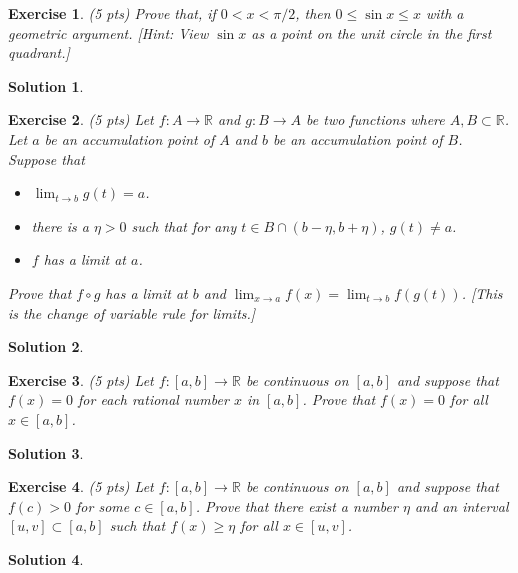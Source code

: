 \documentclass[12pt]{article}
\newcommand{\bR}{\mathbb{R}}
\newcommand{\ra}{\rightarrow}
\theoremstyle{plain}
\newtheorem{exer}{\textbf{Exercise}}}
\theoremstyle{plain}
\newtheorem*{sol}{\textbf{Solution}}}
\begin{document}
\begin{exer}
(5 pts)
Prove that, if $0 < x < \pi/2$, then $0 \leq \sin x \leq x$ with a geometric argument. [Hint: View $\sin x$ as a point on the unit circle in the first quadrant.]
\end{exer}
\begin{sol}

\end{sol}

\begin{exer}
(5 pts)
Let $f : A \ra \bR$ and $g : B \ra A$ be two functions where $A, B \subset \bR$. Let $a$ be an accumulation point of $A$ and $b$ be an accumulation point of $B$. Suppose that
	\begin{itemize}
	\item $\lim_{t \ra b} g(t) = a$.
	\item there is a $\eta > 0$ such that for any $t \in B \cap (b - \eta ,  b + \eta )$, $g(t) \neq a$.
	\item $f$ has a limit at $a$.
	\end{itemize}
Prove that $f \circ g$ has a limit at $b$ and $\lim_{x \ra a} f(x) = \lim_{t \ra b} f(g(t))$. [This is the change of variable rule for limits.]
\end{exer}
\begin{sol}

\end{sol}

\begin{exer}
(5 pts)
Let $f : [a, b] \ra \bR$ be continuous on $[a, b]$ and suppose that $f(x) = 0$ for each rational number $x$ in $[a, b]$. Prove that $f(x) = 0$ for all $x \in [a, b]$.
\end{exer}
\begin{sol}

\end{sol}

\begin{exer}
(5 pts)
Let $f: [a, b] \ra \bR$ be continuous on $[a, b]$ and suppose that $f(c) > 0$ for some $c \in [a, b]$. Prove that there exist a number $\eta$ and an interval $[u, v] \subset [a, b]$ such that $f(x) \geq \eta$ for all $x \in [u, v]$.
\end{exer}
\begin{sol}

\end{sol}
\end{document}

